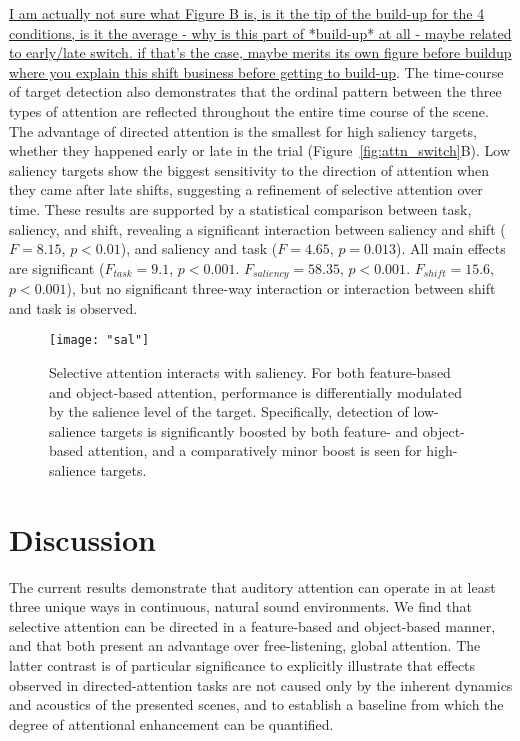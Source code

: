 \documentclass[9pt,twocolumn,twoside]{pnas-new}
\begin{document}
\underline{I am actually not sure what Figure B is, is it the tip of the build-up for the 4 conditions, is it the average - why is this part of *build-up* at all - maybe related to early/late switch. if that's the case, maybe merits its own figure before buildup where you explain this shift business before getting to build-up}. The time-course of target detection also demonstrates that the ordinal pattern between the three types of attention are reflected throughout the entire time course of the scene. The advantage of directed attention is the smallest for high saliency targets, whether they happened early or late in the trial (Figure~\ref{fig:attn_switch}B). Low saliency targets show the biggest sensitivity to the direction of attention when they came after late shifts, suggesting a refinement of selective attention over time. These results are supported by a statistical comparison between task, saliency, and shift, revealing a significant interaction between saliency and shift ($F=8.15$, $p<0.01$), and saliency and task ($F=4.65$, $p=0.013$). All main effects are significant ($F_{task}=9.1$, $p<0.001$. $F_{saliency}=58.35$, $p<0.001$. $F_{shift}=15.6$, $p<0.001$), but no significant three-way interaction or interaction between shift and task is observed. 

\begin{figure}[t]
\centering
\texttt{[image: "sal"]}
\caption[Interaction of selective attention with saliency.]{Selective attention interacts with saliency. For both feature-based and object-based attention, performance is differentially modulated by the salience level of the target. Specifically, detection of low-salience targets is significantly boosted by both feature- and object-based attention, and a comparatively minor boost is seen for high-salience targets.}
\label{fig:attn_sal}
\end{figure}



\section{Discussion}


The current results demonstrate that auditory attention can operate in at least three unique ways in continuous, natural sound environments. We find that selective attention can be directed in a feature-based and object-based manner, and that both present an advantage over free-listening, global attention. The latter contrast is of particular significance to explicitly illustrate that effects observed in directed-attention tasks are not caused only by the inherent dynamics and acoustics of the presented scenes, and to establish a baseline from which the degree of attentional enhancement can be quantified. 
\end{document}
